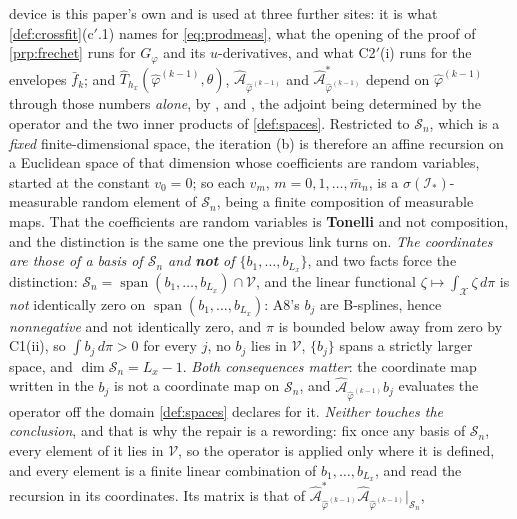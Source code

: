 \begin{enumerate}
{device is this paper's own and is used at three further sites}: it is what \cref{def:crossfit}\textup{(c$'$.1)} names for
\eqref{eq:prodmeas}, what the opening of the proof of \cref{prp:frechet} runs for $G_\varphi$ and its
$u$-derivatives, and what C2$'$(i) runs for the envelopes $\bar f_k$;
and $\hat T_{h_x}(\hat\varphi^{(k-1)},\theta)$, $\hat{\mathcal A}_{\hat\varphi^{(k-1)}}$ and
$\hat{\mathcal A}^\ast_{\hat\varphi^{(k-1)}}$ depend on $\hat\varphi^{(k-1)}$ through those numbers
\emph{alone}, by ,  and , the adjoint being determined by the
operator and the two inner products of \cref{def:spaces}. Restricted to $\mathcal S_n$, which
is a \emph{fixed} finite-dimensional space, the iteration \textup{(b)} is therefore an affine recursion on
a Euclidean space of that dimension whose coefficients are random variables, started at the constant
$v_0=0$; so each
$v_m$, $m=0,1,\dots,\bar m_n$, is a $\sigma(\mathcal I_\ast)$-measurable random element of $\mathcal S_n$, being a
finite composition of measurable maps. That the coefficients are random variables is
\textbf{Tonelli} and not composition, and the distinction is the same one the previous link turns on.
\emph{The coordinates are those of a basis of $\mathcal S_n$ and \textbf{not} of $\{b_1,\dots,b_{L_x}\}$},
and two facts force the distinction:
$\mathcal S_n=\operatorname{span}(b_1,\dots,b_{L_x})\cap\mathcal V$, and the linear functional
$\zeta\mapsto\int_{\mathcal X}\zeta\,d\pi$ is \emph{not} identically zero on
$\operatorname{span}(b_1,\dots,b_{L_x})$: A8's $b_j$ are B-splines, hence \emph{nonnegative} and not
identically zero, and $\pi$ is bounded below away from zero by C1(ii), so
$\int b_j\,d\pi>0$ for every $j$, no $b_j$ lies in $\mathcal V$, $\{b_j\}$ spans a strictly larger space, and
$\dim\mathcal S_n=L_x-1$. \emph{Both consequences matter}: the coordinate map written in the $b_j$ is not a
coordinate map on $\mathcal S_n$, and $\hat{\mathcal A}_{\hat\varphi^{(k-1)}}b_j$ evaluates the operator off
the domain \cref{def:spaces} declares for it. \emph{Neither touches the conclusion}, and that is why the
repair is a rewording: fix once any basis of $\mathcal S_n$, every element of it lies in $\mathcal V$, so
the operator is applied only where it is defined, and every element is a finite linear combination of
$b_1,\dots,b_{L_x}$, and read the recursion in its coordinates. Its matrix is that of
$\hat{\mathcal A}^\ast_{\hat\varphi^{(k-1)}}\hat{\mathcal A}_{\hat\varphi^{(k-1)}}\vert_{\mathcal S_n}$,

\end{enumerate}
